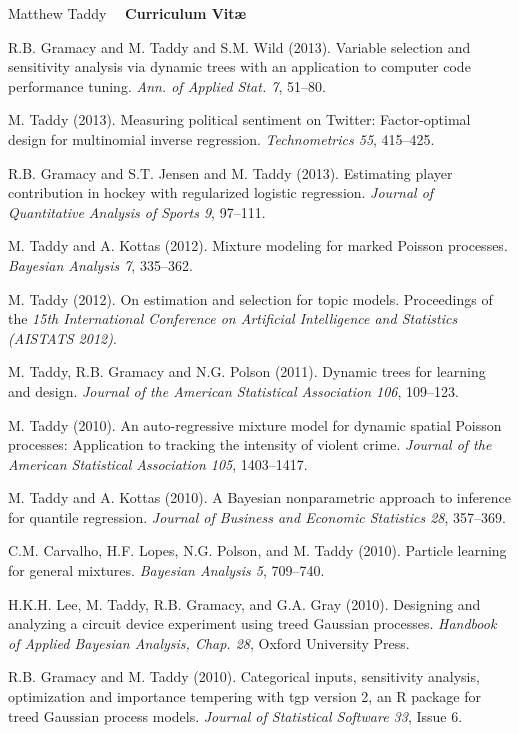 \documentclass[margin,line]{res}
\begin{document}
\begin{resume}
\pagebreak
\hfill Matthew Taddy ~~{\bf Curriculum Vit\ae}



R.B. Gramacy and M. Taddy and S.M. Wild (2013).  Variable selection and
sensitivity analysis via dynamic trees with an application to computer
code performance tuning.  {\it Ann. of Applied
  Stat. 7}, 51--80.

M. Taddy (2013).  Measuring political sentiment on Twitter: Factor-optimal
design for multinomial inverse regression. {\it
  Technometrics 55}, 415--425.


R.B. Gramacy and S.T. Jensen and M. Taddy (2013).  Estimating player contribution in 
hockey with regularized logistic regression. {\it Journal of Quantitative Analysis of Sports 9}, 97--111.

M.  Taddy and A. Kottas (2012). Mixture modeling for marked Poisson processes.
{\it Bayesian Analysis 7}, 335--362.


M. Taddy (2012). On estimation and selection for topic models. Proceedings of the {\it 15th International Conference on
  Artificial Intelligence and Statistics (AISTATS 2012)}.


M. Taddy, R.B. Gramacy and N.G. Polson (2011). Dynamic trees for learning and design.
 {\it Journal of the American Statistical
  Association 106}, 109--123.

M. Taddy (2010). An auto-regressive mixture model for dynamic spatial
Poisson processes: Application to tracking the intensity of violent
crime.  {\it Journal of the American Statistical
  Association 105}, 1403--1417.

M.  Taddy and A. Kottas (2010). A Bayesian nonparametric approach to inference for quantile regression.
{\it Journal of Business and Economic Statistics 28}, 357--369.

C.M. Carvalho, H.F. Lopes, N.G. Polson, and M. Taddy
(2010). Particle learning for general mixtures.  {\it Bayesian
  Analysis 5}, 709--740.

H.K.H. Lee, M. Taddy, R.B. Gramacy, and G.A. Gray
(2010). Designing and analyzing a circuit device experiment using
treed Gaussian processes.  {\it Handbook of Applied
  Bayesian Analysis, Chap. 28}, Oxford University Press.

R.B. Gramacy and M. Taddy (2010). Categorical inputs, sensitivity
       analysis, optimization and importance tempering with tgp version 2, an
       R package for treed Gaussian process models. {\it Journal of Statistical Software 33}, Issue 6.



\end{resume}
\end{document}

